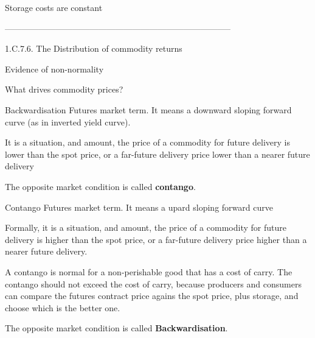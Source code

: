 Storage costs are constant




--------------------------------------------------------------------------------


1.C.7.6. The Distribution of commodity returns

Evidence of non-normality

What drives commodity prices?


Backwardisation
Futures market term. It means a downward sloping forward curve (as in inverted yield curve).

It is a situation, and amount, the price of a commodity for future delivery is lower than the spot price, or a far-future delivery  price
lower than a nearer future delivery

The opposite market condition is called \textbf{contango}.

Contango
Futures market term. It means a upard sloping forward curve 

Formally, it is a situation, and amount, the price of a commodity for future delivery is higher than the spot price, or a far-future delivery  price
higher than a nearer future delivery.

A contango is normal for a non-perishable good that has a cost of carry. The contango should not exceed the cost of carry, because
producers and consumers can compare the futures contract price agains the spot price, plus storage, and choose which is the better one.

The opposite market condition is called \textbf{Backwardisation}.

